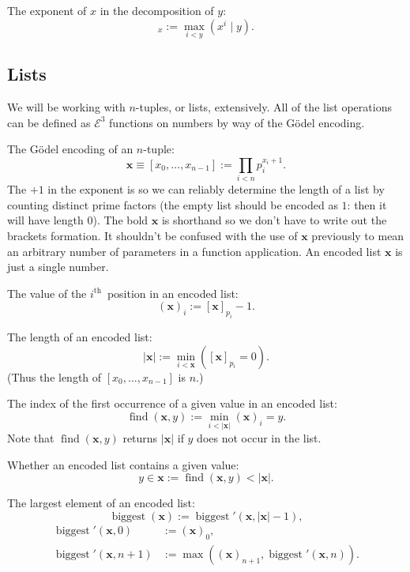 \documentclass[a4paper]{article}
\newcommand{\grz}[1]{$\mathcal{E}^{#1}$}	%
\newcommand{\ith}{$i^{\textrm{th}}$~}
\newcommand{\xvec}{\mathbf{x}}	%
\newcommand{\recurN}[1]{\begin{equation*} \begin{split} #1 \end{split} \end{equation*}}	%
\newcommand{\find}{\operatorname{find}}
\theoremstyle{plain}
\theoremstyle{definition}
\begin{document}
The exponent of $x$ in the decomposition of $y$:
\begin{equation} [y]_x := \max_{i < y} \left( x^i \mid y \right). \end{equation}

\subsection{Lists}\label{sec:lists}

We will be working with $n$-tuples, or lists, extensively. All of the list operations can be defined as \grz{3} functions on numbers by way of the G\"odel encoding.

The G\"odel encoding of an $n$-tuple:
\begin{equation}\label{eq:ntuple} \xvec \equiv [x_0, \dots, x_{n-1}] := \prod_{i < n} p_i^{x_i+1}. \end{equation}
The $+1$ in the exponent is so we can reliably determine the length of a list by counting distinct prime factors (the empty list should be encoded as $1$: then it will have length $0$).
The bold $\xvec$ is shorthand so we don't have to write out the brackets formation. It shouldn't be confused with the use of $\xvec$ previously to mean an arbitrary number of parameters in a function application. An encoded list $\xvec$ is just a single number.

The value of the \ith position in an encoded list:
\begin{equation} (\xvec)_i := [\xvec]_{p_i} - 1. \end{equation}

The length of an encoded list:
\begin{equation} |\xvec| := \min_{i < \xvec} \left([\xvec]_{p_i} = 0  \right).\end{equation}
(Thus the length of $[x_0,\ldots, x_{n-1}]$ is $n$.)

The index of the first occurrence of a given value in an encoded list:
\begin{equation} \find(\xvec,y) := \min_{i < |\xvec|} (\xvec)_i = y. \end{equation}
Note that $\find(\xvec,y)$ returns $|\xvec|$ if $y$ does not occur in the list.

Whether an encoded list contains a given value:
\begin{equation} y \in \xvec := \find(\xvec,y) < |\xvec|. \end{equation}

The largest element of an encoded list:
\begin{equation} \operatorname{biggest}(\xvec) := \operatorname{biggest}'(\xvec,|\xvec|-1), \end{equation}
\recurN{
	\operatorname{biggest}'(\xvec,0) &:= (\xvec)_0, \\ 
	\operatorname{biggest}'(\xvec,n+1) &:= \max \left ( (\xvec)_{n+1},\operatorname{biggest}'(\xvec,n) \right ).
}
\end{document}
